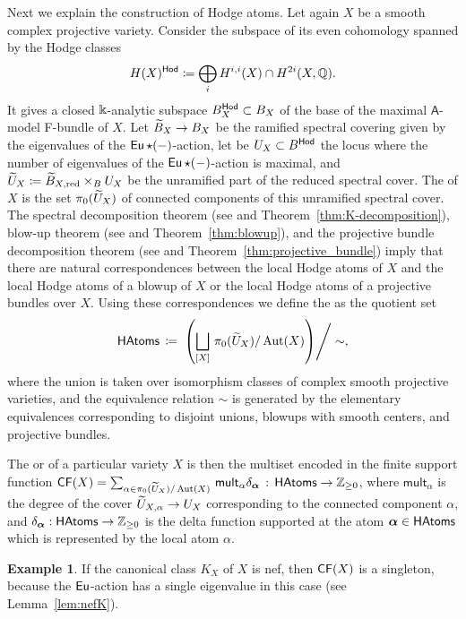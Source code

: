 \documentclass[twoside,leqno]{article}
\numberwithin{equation}{section}
\theoremstyle{plain}
\theoremstyle{definition}
\newtheorem*{example*}{Example}
\begin{document}
Next we explain the construction of Hodge atoms.
Let again $X$ be a smooth complex projective variety. Consider the subspace of its even
cohomology spanned by the Hodge classes
\[
H(X)^{\mathsf{Hod}} \coloneqq \bigoplus_i H^{i,i}(X) \cap H^{2i}(X, \mathbb{Q}) .
\]
It gives a closed $\Bbbk$-analytic subspace $B^{\mathsf{Hod}}_{X} \subset B_{X}$ of the base of the maximal $\mathsf{A}$-model F-bundle of $X$.
Let $\widetilde{B}_{X} \to B_{X}$ be the ramified spectral  covering given by the eigenvalues of the $\operatorname{\mathsf{Eu}}\star (-)$-action, let be $U_X \subset B^{\mathsf{Hod}}$ the locus where the number of eigenvalues of the $\operatorname{\mathsf{Eu}}\star (-)$-action is maximal, and $\widetilde U_X \coloneqq \widetilde{B}_{X,\operatorname{red}} \times_B U_X$ be the unramified part of the reduced spectral cover.
 The  of $X$ is the set 
$\pi_{0}(\widetilde U_{X})$ of connected components of this unramified spectral cover.
The spectral decomposition theorem (see \cite{HYZZ_Decomposition} and Theorem~\ref{thm:K-decomposition}), blow-up theorem (see \cite{Iritani_blowup} and Theorem~\ref{thm:blowup}), and the projective bundle  decomposition theorem (see \cite{Iritani_Koto,HYZZ_Decomposition} and Theorem~\ref{thm:projective_bundle}) imply that 
there are natural correspondences between the local Hodge atoms of $X$ and the local Hodge atoms of a blowup of $X$ or the local Hodge atoms of a projective bundles over $X$. Using these correspondences we define the  as the quotient set
\[
\mathsf{HAtoms} \, \coloneqq \, \left.\left( \bigsqcup_{[X]} \, \pi_{0}(\widetilde U_{X})/\operatorname{Aut}(X)\right)\right/\sim, 
\] 
where the union is taken over isomorphism classes of complex smooth projective varieties, and the equivalence relation $\sim$ is generated by the elementary equivalences corresponding to 
disjoint unions, blowups with smooth centers, and projective bundles.

The  or  of a particular variety $X$ is then the multiset 
encoded in the finite support function $\mathsf{CF}(X) = \sum_{\alpha \in \pi_{0}(\widetilde U_{X})/\operatorname{Aut}(X)} \, \mathsf{mult}_{\alpha} \delta_{\boldsymbol{\alpha}} \, : \, \mathsf{HAtoms} \to \mathbb Z_{\geq 0}$, where
$\mathsf{mult}_{\alpha}$ is the degree of the cover $\widetilde U_{X,\alpha} \to U_{X}$ corresponding to the connected component $\alpha$, and $\delta_{\boldsymbol{\alpha}} : \mathsf{HAtoms} \to \mathbb Z_{\geq 0}$ is the delta function supported at the atom $\boldsymbol{\alpha} \in \mathsf{HAtoms}$ which is represented by the local atom $\alpha$.


\begin{example*}
If the canonical class $K_X$ of $X$ is nef, then $\mathsf{CF}(X)$ is a singleton, because the $\operatorname{\mathsf{Eu}}$-action has a single eigenvalue in this case (see Lemma~\ref{lem:nefK}).
\end{example*}
\end{document}
